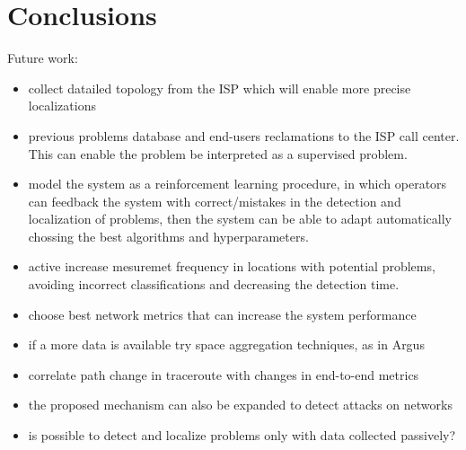 \chapter{Conclusions}

Future work:
\begin{itemize}
\item collect datailed topology from the ISP which will enable more precise
localizations
\item previous problems database and end-users reclamations to the ISP call center.
This can enable the problem be interpreted as a supervised problem.
\item model the system as a reinforcement learning procedure, in which operators
can feedback the system with correct/mistakes in the detection and localization
of problems, then the system can be able to adapt automatically chossing the
best algorithms and hyperparameters.
\item active increase mesuremet frequency in locations with potential problems,
avoiding incorrect classifications and decreasing the detection time.
\item choose best network metrics that can increase the system performance
\item if a more data is available try space aggregation techniques, as in Argus
\item correlate path change in traceroute with changes in end-to-end metrics
\item the proposed mechanism can also be expanded to detect attacks on networks
\item is possible to detect and localize problems only with data collected
passively?
\end{itemize}
